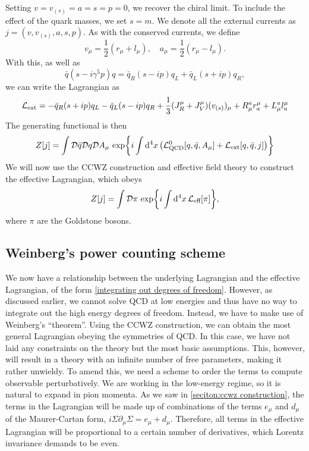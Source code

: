 Setting $v = v_{(s)} = a = s = p = 0$, we recover the chiral limit.
To include the effect of the quark masses, we set $s = m$.
We denote all the external currents as $j = (v, v_{(s)}, a, s, p )$.
As with the conserved currents, we define
\begin{equation}
    v_\mu = \frac{1}{2}(r_\mu + l_\mu),
    \quad
    a_\mu = \frac{1}{2}(r_\mu - l_\mu).
\end{equation}
With this, as well as 
\begin{equation}
    \bar q (s - i \gamma^5 p) q
    = \bar q_R (s - i p) q_L + \bar q_L (s + i p) q_R,
\end{equation}
we can write the Lagrangian as
\begin{equation}
    \mathcal{L}_\text{ext} 
    = - \bar q_R (s + i p) q_L - \bar q_L (s - i p) q_R
    + \frac{1}{3} (J_R^\mu + J_V^\mu)(v_{(s)})_\mu
    + R_\mu^a r^\mu_a + L_\mu^a l^\mu_a
\end{equation}
The generating functional is then
\begin{equation}
    Z[j] 
    = 
    \int \mathcal{D} \bar q \mathcal{D} q \mathcal{D} A_\mu \, 
    \exp{
        i \int \dd^4 x 
        \left( 
            \mathcal{L}^0_\text{QCD}[q, \bar q, A_\mu] + \mathcal{L}_\text{ext}[q, \bar q, j]
        \right)
    }
\end{equation}
We will now use the CCWZ construction and effective field theory to construct the effective Lagrangian, which obeys
\begin{equation}
    Z[j] = \int \mathcal{D} \pi \, \exp{i \int \dd^4 x \, \mathcal{L}_\text{eff}[\pi]},
\end{equation}
where $\pi$ are the Goldstone bosons.

\subsection*{Weinberg's power counting scheme}
\label{subsection:power counting}

We now have a relationship between the underlying Lagrangian and the effective Lagrangian, of the form \autoref{integrating out degrees of freedom}.
However, as discussed earlier, we cannot solve QCD at low energies and thus have no way to integrate out the high energy degrees of freedom.
Instead, we have to make use of Weinberg's ``theorem''.
Using the CCWZ construction, we can obtain the most general Lagrangian obeying the symmetries of QCD. 
In this case, we have not laid any constraints on the theory but the most basic assumptions.
This, however, will result in a theory with an infinite number of free parameters, making it rather unwieldy.
To amend this, we need a scheme to order the terms to compute observable perturbatively.
We are working in the low-energy regime, so it is natural to expand in pion momenta.
As we saw in \autoref{seciton:ccwz construction}, the terms in the Lagrangian will be made up of combinations of the terms $e_\mu$ and $d_\mu$ of the Maurer-Cartan form, $i\Sigma \partial_\mu \Sigma = e_\mu + d_\mu$.
Therefore, all terms in the effective Lagrangian will be proportional to a certain number of derivatives, which Lorentz invariance demands to be even.

